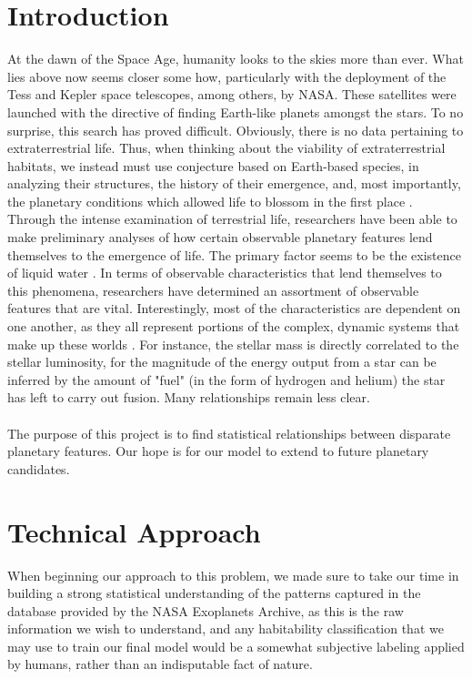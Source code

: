 \documentclass[11.5pt]{article}
\begin{document}
\section{Introduction}
At the dawn of the Space Age, humanity looks to the skies more than ever. What lies above now seems closer some how, particularly with the deployment of the Tess and Kepler space telescopes, among others, by NASA. These satellites were launched with the directive of finding Earth-like planets amongst the stars. To no surprise, this search has proved difficult. Obviously, there is no data pertaining to extraterrestrial life. Thus, when thinking about the viability of extraterrestrial habitats, we instead must use conjecture based on Earth-based species, in analyzing their structures, the history of their emergence, and, most importantly, the planetary conditions which allowed life to blossom in the first place \cite{Zeiler}.\\
\> Through the intense examination of terrestrial life, researchers have been able to make preliminary analyses of how certain observable planetary features lend themselves to the emergence of life. The primary factor seems to be the existence of liquid water \cite{Zeiler}. In terms of observable characteristics that lend themselves to this phenomena, researchers have determined an assortment of observable features that are vital. Interestingly, most of the characteristics are dependent on one another, as they all represent portions of the complex, dynamic systems that make up these worlds \cite{Zeiler}. For instance, the stellar mass is directly correlated to the stellar luminosity, for the magnitude of the energy output from a star can be inferred by the amount of "fuel" (in the form of hydrogen and helium) the star has left to carry out fusion. \cite{Danchi1} Many relationships remain less clear.
\\
\\
The purpose of this project is to find statistical relationships between disparate planetary features. Our hope is for our model to extend to future planetary candidates.


\section{Technical Approach}
\> When beginning our approach to this problem, we  made sure to take our time in building a strong statistical understanding of the patterns captured in the database provided by the NASA Exoplanets Archive, as this is the raw information we wish to understand, and any habitability classification that we may use to train our final model would be a somewhat subjective labeling applied by humans, rather than an indisputable fact of nature. 
\end{document}

